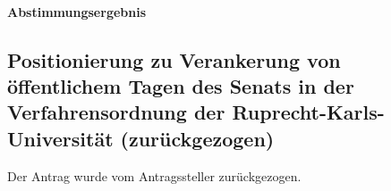 \paragraph{Abstimmungsergebnis}
\subsection{Positionierung zu Verankerung von öffentlichem Tagen des Senats in der Verfahrensordnung der Ruprecht-Karls-Universität (zurückgezogen)}
Der Antrag wurde vom Antragssteller zurückgezogen.